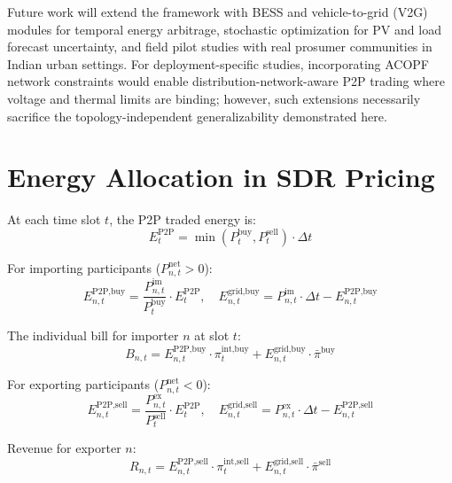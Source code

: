 \documentclass[pdflatex,sn-mathphys-num]{sn-jnl}
\theoremstyle{thmstyleone}
\theoremstyle{thmstyletwo}
\begin{document}
Future work will extend the framework with BESS and vehicle-to-grid (V2G) modules for temporal energy arbitrage, stochastic optimization for PV and load forecast uncertainty, and field pilot studies with real prosumer communities in Indian urban settings. For deployment-specific studies, incorporating ACOPF network constraints would enable distribution-network-aware P2P trading where voltage and thermal limits are binding; however, such extensions necessarily sacrifice the topology-independent generalizability demonstrated here.

\appendix
\section{Energy Allocation in SDR Pricing}\label{app:allocation}

At each time slot $t$, the P2P traded energy is:
\begin{equation}
    E_t^{\text{P2P}} = \min(P_t^{\text{buy}}, P_t^{\text{sell}}) \cdot \Delta t
\end{equation}

For importing participants ($P_{n,t}^{\text{net}} > 0$):
\begin{equation}
    E_{n,t}^{\text{P2P,buy}} = \frac{P_{n,t}^{\text{im}}}{P_t^{\text{buy}}} \cdot E_t^{\text{P2P}}, \quad E_{n,t}^{\text{grid,buy}} = P_{n,t}^{\text{im}} \cdot \Delta t - E_{n,t}^{\text{P2P,buy}}
\end{equation}

The individual bill for importer $n$ at slot $t$:
\begin{equation}
    B_{n,t} = E_{n,t}^{\text{P2P,buy}} \cdot \pi_t^{\text{int,buy}} + E_{n,t}^{\text{grid,buy}} \cdot \bar{\pi}^{\text{buy}}
\end{equation}

For exporting participants ($P_{n,t}^{\text{net}} < 0$):
\begin{equation}
    E_{n,t}^{\text{P2P,sell}} = \frac{P_{n,t}^{\text{ex}}}{P_t^{\text{sell}}} \cdot E_t^{\text{P2P}}, \quad E_{n,t}^{\text{grid,sell}} = P_{n,t}^{\text{ex}} \cdot \Delta t - E_{n,t}^{\text{P2P,sell}}
\end{equation}

Revenue for exporter $n$:
\begin{equation}
    R_{n,t} = E_{n,t}^{\text{P2P,sell}} \cdot \pi_t^{\text{int,sell}} + E_{n,t}^{\text{grid,sell}} \cdot \bar{\pi}^{\text{sell}}
\end{equation}


\end{document}
